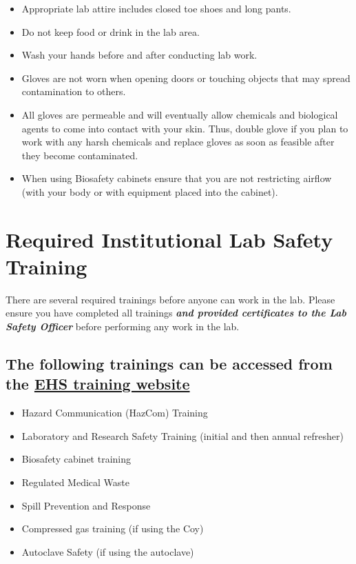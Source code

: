 \documentclass[
]{book}
\providecommand{\tightlist}{%
  \setlength{\itemsep}{0pt}\setlength{\parskip}{0pt}}
\begin{document}
\begin{itemize}
\item
  Appropriate lab attire includes closed toe shoes and long pants.
\item
  Do not keep food or drink in the lab area.
\item
  Wash your hands before and after conducting lab work.
\item
  Gloves are not worn when opening doors or touching objects that may spread contamination to others.
\item
  All gloves are permeable and will eventually allow chemicals and biological agents to come into contact with your skin. Thus, double glove if you plan to work with any harsh chemicals and replace gloves as soon as feasible after they become contaminated.
\item
  When using Biosafety cabinets ensure that you are not restricting airflow (with your body or with equipment placed into the cabinet).
\end{itemize}

\section{Required Institutional Lab Safety Training}\label{required-institutional-lab-safety-training}

There are several required trainings before anyone can work in the lab. Please ensure you have completed all trainings \textbf{\emph{and provided certificates to the Lab Safety Officer}} before performing any work in the lab.

\subsection{\texorpdfstring{The following trainings can be accessed from the \href{https://ehs.psu.edu/training}{EHS training website}}{The following trainings can be accessed from the EHS training website}}\label{the-following-trainings-can-be-accessed-from-the-ehs-training-website}

\begin{itemize}
\tightlist
\item
  Hazard Communication (HazCom) Training
\item
  Laboratory and Research Safety Training (initial and then annual refresher)
\item
  Biosafety cabinet training
\item
  Regulated Medical Waste
\item
  Spill Prevention and Response
\item
  Compressed gas training (if using the Coy)
\item
  Autoclave Safety (if using the autoclave)
\end{itemize}
\end{document}
